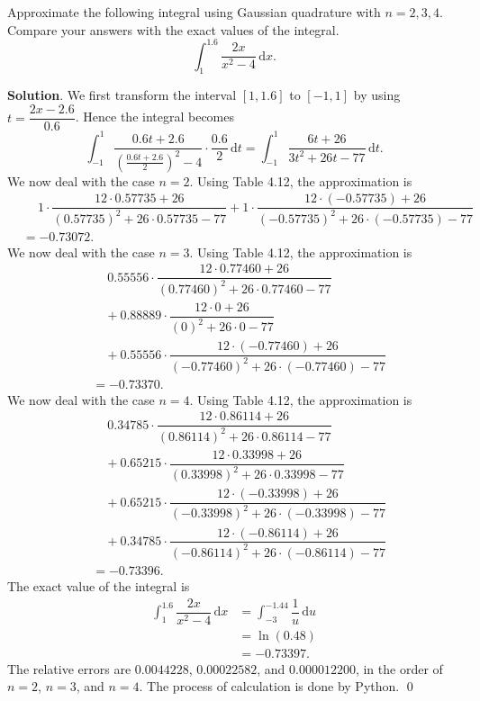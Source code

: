 \documentclass[11pt]{article}
\theoremstyle{break}
\newcommand{\ddi}{\text{$\,$d}}
\numberwithin{equation}{theorem}
\begin{document}
\newpage
\begin{problem}\label{problem 14} %
    Approximate the following integral using Gaussian quadrature with $n=2, 3, 4$. Compare your answers with the exact values of the integral. $$\int_{1}^{1.6}\dfrac{2x}{x^2-4}\ddi x.$$
\end{problem}
\textbf{Solution}. We first transform the interval $[1, 1.6]$ to $[-1, 1]$ by using $t=\dfrac{2x-2.6}{0.6}$. Hence the integral becomes $$\int_{-1}^{1}\dfrac{0.6t+2.6}{\left(\frac{0.6t+2.6}{2}\right)^2-4}\cdot\dfrac{0.6}{2}\ddi t=\int_{-1}^{1}\dfrac{6t+26}{3t^2+26t-77}\ddi t.$$ We now deal with the case $n=2$. Using Table 4.12, the approximation is \begin{align*}
    &\quad\ 1\cdot\dfrac{12\cdot 0.57735+26}{(0.57735)^2+26\cdot0.57735-77}+1\cdot\dfrac{12\cdot (-0.57735)+26}{(-0.57735)^2+26\cdot(-0.57735)-77}\\
    &=-0.73072.
\end{align*} We now deal with the case $n=3$. Using Table 4.12, the approximation is \begin{align*}
    &\quad\ 0.55556\cdot\dfrac{12\cdot 0.77460+26}{(0.77460)^2+26\cdot0.77460-77}\\&\quad+0.88889\cdot\dfrac{12\cdot 0+26}{(0)^2+26\cdot0-77}\\&\quad+0.55556\cdot\dfrac{12\cdot (-0.77460)+26}{(-0.77460)^2+26\cdot(-0.77460)-77}\\
    &=-0.73370.
\end{align*} We now deal with the case $n=4$. Using Table 4.12, the approximation is \begin{align*}
    &\quad\ 0.34785\cdot\dfrac{12\cdot 0.86114+26}{(0.86114)^2+26\cdot0.86114-77}\\&\quad+0.65215\cdot\dfrac{12\cdot 0.33998+26}{(0.33998)^2+26\cdot0.33998-77}\\&\quad+0.65215\cdot\dfrac{12\cdot (-0.33998)+26}{(-0.33998)^2+26\cdot(-0.33998)-77}\\&\quad+0.34785\cdot\dfrac{12\cdot (-0.86114)+26}{(-0.86114)^2+26\cdot(-0.86114)-77}\\
    &=-0.73396.
\end{align*} The exact value of the integral is \begin{align*}
    \int_{1}^{1.6}\dfrac{2x}{x^2-4}\ddi x&=\int_{-3}^{-1.44}\dfrac{1}{u}\ddi u\\
    &=\ln(0.48)\\
    &=-0.73397.
\end{align*} The relative errors are $0.0044228$, $0.00022582$, and $0.000012200$, in the order of $n=2$, $n=3$, and $n=4$. The process of calculation is done by Python. \qed
\end{document}
